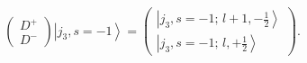 \begin{equation}
\left(
\begin{array}{c}
D^{+} \\
D^{-}
\end{array}
\right) \left| j_{3},s=-1\right\rangle =\left(
\begin{array}{c}
\left| j_{3},s=-1;\,l+1,-\frac{1}{2}\right\rangle \\
\left| j_{3},s=-1;\,l,+\frac{1}{2}\right\rangle
\end{array}
\right) .
\end{equation}

